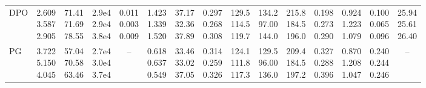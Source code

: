 \begin{landscape}
\begin{table}[t]
{\begin{tabular}{@{}lrrrrrrrrrrrrrr@{}}
DPO & \makecell[r]{2.609\\3.587\\2.905} & \makecell[r]{71.41\\71.69\\78.55} & \makecell[r]{2.9e4\\2.9e4\\3.8e4} & \makecell[r]{0.011\\0.003\\0.009} & \makecell[r]{1.423\\1.339\\1.520} & \makecell[r]{37.17\\32.36\\37.89} & \makecell[r]{0.297\\0.268\\0.308} & \makecell[r]{129.5\\114.5\\119.7} & \makecell[r]{134.2\\97.00\\144.0} & \makecell[r]{215.8\\184.5\\196.0} & \makecell[r]{0.198\\0.273\\0.290} & \makecell[r]{0.924\\1.223\\1.079} & \makecell[r]{0.100\\0.065\\0.096} & \makecell[r]{25.94\\25.61\\26.40} \\
PG & \makecell[r]{3.722\\5.150\\4.045} & \makecell[r]{57.04\\70.58\\63.46} & \makecell[r]{2.7e4\\3.0e4\\3.7e4} & \multicolumn{1}{c}{--} & \makecell[r]{0.618\\0.637\\0.549} & \makecell[r]{33.46\\33.02\\37.05} & \makecell[r]{0.314\\0.259\\0.326} & \makecell[r]{124.1\\111.8\\117.3} & \makecell[r]{129.5\\96.00\\136.0} & \makecell[r]{209.4\\184.5\\197.2} & \makecell[r]{0.327\\0.288\\0.396} & \makecell[r]{0.870\\1.208\\1.047} & \makecell[r]{0.240\\0.244\\0.246} & \multicolumn{1}{c}{--} \\

\end{tabular}}
\end{table}
\end{landscape}

